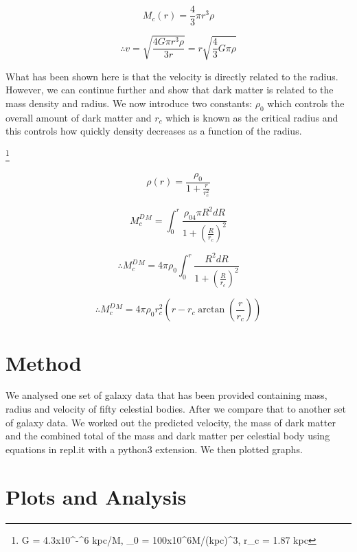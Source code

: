 \documentclass[10pt, twocolumn, twoside]{article}
\begin{document}
\begin{equation}
M_c(r) = \frac{4}{3}\pi r^3\rho
\end{equation}

\begin{equation}
\therefore v = \sqrt{\frac{4G\pi r^3\rho}{3r}} = r\sqrt{\frac{4}{3}G\pi\rho} 
\end{equation}

What has been shown here is that the velocity is directly related to the radius. However, we can continue further and show that dark matter is related to the mass density and radius. We now introduce two constants: $\rho_0$ which controls the overall amount of dark matter and $r_c$ which is known as the critical radius and this controls how quickly density decreases as a function of the radius.

\footnote{G = 4.3x10^-^6 kpc/M, \rho_0 = 100x10^6M/(kpc)^3, r_c = 1.87 kpc}

\begin{equation}
\rho(r) = \frac{\rho_0}{1+\frac{r}{r_c^2}}
\end{equation}

\begin{equation}
M_c^D^M = \int_0^r \frac{\rho_04\pi R^2 d R}{1+(\frac{R}{r_c})^2}
\end{equation}

\begin{equation}
\therefore M_c^D^M = 4\pi\rho_0\int_0^r \frac{R^2 d R}{1+(\frac{R}{r_c})^2}
\end{equation}

\begin{equation}
\therefore M_c^D^M = 4\pi\rho_0r_c^2(r-r_c\arctan(\frac{r}{r_c})) 
\end{equation}

\section{Method}
We analysed one set of galaxy data that has been provided containing mass, radius and velocity of fifty celestial bodies. After we compare that to another set of galaxy data. We worked out the predicted velocity, the mass of dark matter and the combined total of the mass and dark matter per celestial body using equations in repl.it with a python3 extension. We then plotted graphs.

\section{Plots and Analysis}
\end{document}
